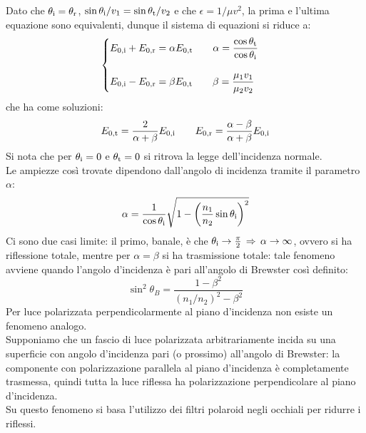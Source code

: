 Dato che $ \theta_{\text{i}} = \theta_{\text{r}} $, $ \sin\theta_{\text{i}} / v_1 = \sin\theta_{\text{t}} / v_2 $ e che $ \epsilon = 1 / \mu v^2 $, la prima e l'ultima equazione sono equivalenti, dunque il sistema di equazioni si riduce a: 
\begin{equation}
	\begin{cases}
		E_{0,\text{i}} + E_{0,\text{r}} = \alpha E_{0,\text{t}} \qquad \alpha = \displaystyle\frac{\cos\theta_{\text{t}}}{\cos\theta_{\text{i}}} \\ 
		\\ 
		E_{0,\text{i}} - E_{0,\text{r}} = \beta E_{0,\text{t}} \qquad \beta = \displaystyle\frac{\mu_1 v_1}{\mu_2 v_2} \\ 
	\end{cases}
	\label{eq:67}
\end{equation}
che ha come soluzioni:
\begin{equation}
	E_{0,\text{t}} = \frac{2}{\alpha + \beta} E_{0,\text{i}} \qquad E_{0,\text{r}} = \frac{\alpha - \beta}{\alpha + \beta} E_{0,\text{i}}
	\label{eq:68}
\end{equation}
Si nota che per $ \theta_{\text{i}} = 0 $ e $ \theta_{\text{t}} = 0 $ si ritrova la legge dell'incidenza normale. \\ 
Le ampiezze così trovate dipendono dall'angolo di incidenza tramite il parametro $ \alpha $:
\begin{equation}
	\alpha = \frac{1}{\cos\theta_{\text{i}}} \sqrt{1 - \left(\frac{n_1}{n_2} \sin\theta_{\text{i}}\right)^2}
	\label{eq:69}
\end{equation}
Ci sono due casi limite: il primo, banale, è che $ \theta_{\text{i}} \rightarrow \frac{\pi}{2} \,\Rightarrow\, \alpha \rightarrow \infty $, ovvero si ha riflessione totale, mentre per $ \alpha = \beta $ si ha trasmissione totale: tale fenomeno avviene quando l'angolo d'incidenza è pari all'angolo di Brewster così definito:
\begin{equation}
	\sin^2 \theta_B = \frac{1 - \beta^2}{(n_1 / n_2)^2 - \beta^2}
	\label{eq:70}
\end{equation}
Per luce polarizzata perpendicolarmente al piano d'incidenza non esiste un fenomeno analogo. \\ 
Supponiamo che un fascio di luce polarizzata arbitrariamente incida su una superficie con angolo d'incidenza pari (o prossimo) all'angolo di Brewster: la componente con polarizzazione parallela al piano d'incidenza è completamente trasmessa, quindi tutta la luce riflessa ha polarizzazione perpendicolare al piano d'incidenza. \\ 
Su questo fenomeno si basa l'utilizzo dei filtri polaroid negli occhiali per ridurre i riflessi.

